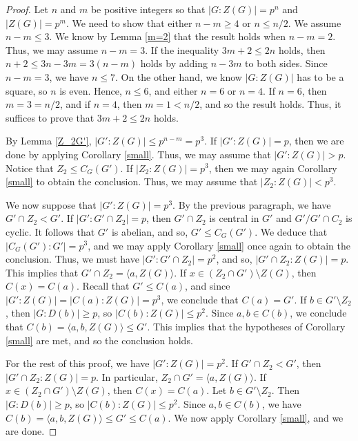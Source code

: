 \begin{proof}
Let $n$ and $m$ be positive integers so that $|G:Z(G)| = p^n$ and $|Z(G)| = p^{m}$.  We need to show that either $n - m \ge 4$ or $n \le n/2$.  We assume $n - m \le 3$.  We know by Lemma \ref{m=2} that the result holds when $n - m = 2$.  Thus, we may assume $n - m = 3$.  If the inequality $3m + 2 \le 2n$ holds, then $n + 2 \le 3n - 3m = 3(n - m)$ holds by adding $n - 3m$ to both sides.  Since $n - m = 3$, we have $n \le 7$.  On the other hand, we know $|G:Z (G)|$ has to be a square, so $n$ is even.  Hence, $n \le 6$, and either $n = 6$ or $n = 4$.  If $n = 6$, then $m = 3 = n/2$, and if $n = 4$, then $m  = 1 < n/2$, and so the result holds.  Thus, it suffices to prove that $3m + 2 \le 2n$ holds.

By Lemma \ref{Z_2G'}, $|G':Z(G)| \le p^{n-m} = p^3$.  If $|G':Z(G)| = p$, then we are done by applying Corollary \ref{small}.  Thus, we may assume that $|G':Z (G)| > p$.  Notice that $Z_2 \le C_G (G')$.  If $|Z_2:Z (G)| = p^3$, then we may again Corollary \ref{small} to obtain the conclusion.  Thus, we may assume that $|Z_2:Z (G)| < p^3$.

We now suppose that $|G':Z (G)| = p^3$.  By the previous paragraph, we have $G' \cap Z_2 < G'$.  If $|G':G' \cap Z_2| = p$, then $G' \cap Z_2$ is central in $G'$ and $G'/G' \cap C_2$ is cyclic.  It follows that $G'$ is abelian, and so, $G' \le C_G (G')$.  We deduce that $|C_G (G'):G'| = p^3$, and we may apply Corollary \ref{small} once again to obtain the conclusion.  Thus, we must have $|G':G' \cap Z_2| = p^2$, and so, $|G' \cap Z_2: Z (G)| = p$.  This implies that $G' \cap Z_2 = \langle a, Z(G) \rangle$.  If $x \in (Z_2 \cap G') \setminus Z(G)$, then $C (x) = C(a)$.  Recall that $G' \le C (a)$, and since $|G':Z (G)| = |C (a): Z(G)| = p^3$, we conclude that $C (a) = G'$.  If $b \in G' \setminus Z_2$, then $|G:D (b)| \ge p$, so $|C (b):Z (G)| \le p^2$.  Since $a, b \in C (b)$, we conclude that $C (b) = \langle a, b, Z (G) \rangle \le G'$.  This implies that the hypotheses of Corollary \ref{small} are met, and so the conclusion holds.

For the rest of this proof, we have $|G':Z (G)| = p^2$.  If $G' \cap Z_2 < G'$, then $|G' \cap Z_2: Z(G)| = p$.  In particular, $Z_2 \cap G' = \langle a, Z(G) \rangle$.  If $x \in (Z_2 \cap G') \setminus Z(G)$, then $C (x) = C(a)$.  Let $b \in G' \setminus Z_2$.  Then $|G:D (b)| \ge p$, so $|C (b): Z (G)| \le p^2$.  Since $a, b \in C (b)$, we have $C (b) = \langle a, b, Z(G) \rangle \le G' \le C (a)$.  We now apply Corollary \ref{small}, and we are done.


\end{proof}
